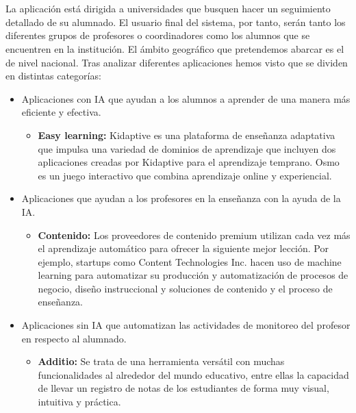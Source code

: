 \chapter{\mercado}

\paragraph{}
La aplicación está dirigida a universidades que busquen hacer un seguimiento detallado de su alumnado. El usuario final del sistema, por tanto, serán tanto los diferentes grupos de profesores o coordinadores como los alumnos que se encuentren en la institución. El ámbito geográfico que pretendemos abarcar es el de nivel nacional. Tras analizar diferentes aplicaciones hemos visto que se dividen en distintas categorías:

\begin{itemize}
\item Aplicaciones con IA que ayudan a los alumnos a aprender de una manera más eficiente y efectiva.
\begin{itemize}
\item \textbf{Easy learning:} Kidaptive es una plataforma de enseñanza adaptativa que impulsa una variedad de dominios de aprendizaje que incluyen dos aplicaciones creadas por Kidaptive para el aprendizaje temprano. Osmo es un juego interactivo que combina aprendizaje online y experiencial.
\end{itemize}
\item Aplicaciones que ayudan a los profesores en la enseñanza con la ayuda de la IA.
\begin{itemize}
\item \textbf{Contenido:} Los proveedores de contenido premium utilizan cada vez más el aprendizaje automático para ofrecer la siguiente mejor lección. Por ejemplo, startups como Content Technologies Inc. hacen uso de machine learning para automatizar su producción y automatización de procesos de negocio, diseño instruccional y soluciones de contenido y el proceso de enseñanza. 
\end{itemize}
\item Aplicaciones sin IA que automatizan las actividades de monitoreo del profesor en respecto al alumnado.\cite{appsEvaluacionEstudiantes}
\begin{itemize}
\item \textbf{Additio:} Se trata de una herramienta versátil con muchas funcionalidades al alrededor del mundo educativo, entre ellas la capacidad de llevar un registro de notas de los estudiantes de forma muy visual, intuitiva y práctica.

\end{itemize}
\end{itemize}
